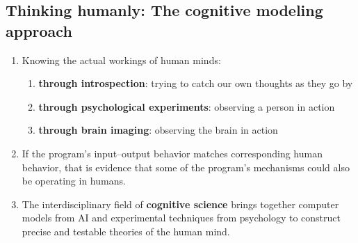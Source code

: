 








\subsection{Thinking humanly: The cognitive modeling approach}\label{Artificial Intelligence: Introduction/Approaches to AI/Thinking humanly: The cognitive modeling approach}

\begin{enumerate}[itemsep=0.2cm]
    \item Knowing the actual workings of human minds:
    \begin{enumerate}
        \item \textbf{through introspection}: trying to catch our own thoughts as they go by
        \hfill \cite{ai/book/Artificial-Intelligence-A-Modern-Approach/Russell-Norvig}

        \item \textbf{through psychological experiments}: observing a person in action
        \hfill \cite{ai/book/Artificial-Intelligence-A-Modern-Approach/Russell-Norvig}

        \item \textbf{through brain imaging}: observing the brain in action
        \hfill \cite{ai/book/Artificial-Intelligence-A-Modern-Approach/Russell-Norvig}
    \end{enumerate}

    \item  If the program’s input–output behavior matches corresponding human behavior, that is evidence that some of the program’s mechanisms could also be operating in humans.
    \hfill \cite{ai/book/Artificial-Intelligence-A-Modern-Approach/Russell-Norvig}

    \item The interdisciplinary field of \textbf{cognitive science}\label{Artificial Intelligence: Introduction/Approaches to AI/Thinking humanly: The cognitive modeling approach/cognitive science} brings together computer models from AI and experimental techniques from psychology to construct precise and testable theories of the human mind.
    \hfill \cite{ai/book/Artificial-Intelligence-A-Modern-Approach/Russell-Norvig}
\end{enumerate}







